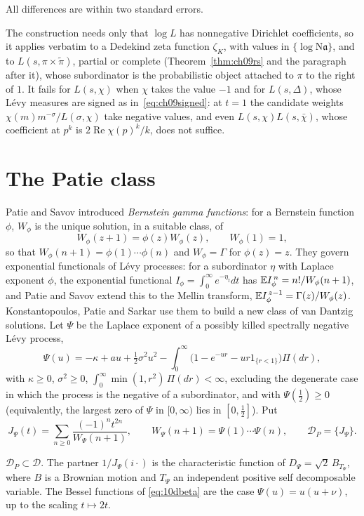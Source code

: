 \noindent All differences are within two standard errors.

The construction needs only that $\log L$ has nonnegative Dirichlet coefficients, so it applies verbatim to a Dedekind zeta function $\zeta_K$, with values in $\{\log\mathrm N\mathfrak a\}$, and to $L(s,\pi\times\tilde\pi)$, partial or complete (Theorem~\ref{thm:ch09rs} and the paragraph after it), whose subordinator is the probabilistic object attached to $\pi$ to the right of $1$. It fails for $L(s,\chi)$ when $\chi$ takes the value $-1$ and for $L(s,\Delta)$, whose L\'evy measures are signed as in~\eqref{eq:ch09signed}: at $t=1$ the candidate weights $\chi(m)m^{-\sigma}/L(\sigma,\chi)$ take negative values, and even $L(s,\chi)L(s,\bar\chi)$, whose coefficient at $p^k$ is $2\operatorname{Re}\chi(p)^k/k$, does not suffice.

\section{The Patie class}

Patie and Savov \cite{patiesavov2018} introduced \emph{Bernstein gamma functions}: for a Bernstein function $\phi$, $W_\phi$ is the unique solution, in a suitable class, of
\[
W_\phi(z+1) = \phi(z)W_\phi(z),\qquad W_\phi(1) = 1,
\]
so that $W_\phi(n+1) = \phi(1)\cdots\phi(n)$ and $W_\phi = \Gamma$ for $\phi(z) = z$. They govern exponential functionals of L\'evy processes: for a subordinator $\eta$ with Laplace exponent $\phi$, the exponential functional $I_\phi = \int_0^\infty e^{-\eta_t}dt$ has $\mathbb{E} I_\phi^{\,n} = n!/W_\phi(n+1)$, and Patie and Savov extend this to the Mellin transform, $\mathbb{E} I_\phi^{\,z-1} = \Gamma(z)/W_\phi(z)$. Konstantopoulos, Patie and Sarkar use them to build a new class of van Dantzig solutions. Let $\Psi$ be the Laplace exponent of a possibly killed spectrally negative L\'evy process,
\[
\Psi(u) = -\kappa+au+\tfrac12\sigma^2u^2-\int_0^\infty\bigl(1-e^{-ur}-ur\mathrm{1}_{\{r<1\}}\bigr)\Pi(dr),
\]
with $\kappa\ge0$, $\sigma^2\ge0$, $\int_0^\infty\min(1,r^2)\,\Pi(dr)<\infty$, excluding the degenerate case in which the process is the negative of a subordinator, and with $\Psi(\frac12)\ge0$ (equivalently, the largest zero of $\Psi$ in $[0,\infty)$ lies in $[0,\frac12]$). Put
\[
J_\Psi(t) = \sum_{n\ge0}\frac{(-1)^nt^{2n}}{W_\Psi(n+1)},\qquad W_\Psi(n+1) = \Psi(1)\cdots\Psi(n),\qquad\mathcal D_P = \{J_\Psi\}.
\]

\begin{theorem}\label{thm:10dpatie}
$\mathcal D_P\subset\mathcal D$. The partner $1/J_\Psi(i\cdot)$ is the characteristic function of $D_\Psi = \sqrt2\,B_{T_\Psi}$, where $B$ is a Brownian motion and $T_\Psi$ an independent positive self decomposable variable. The Bessel functions of \eqref{eq:10dbeta} are the case $\Psi(u) = u(u+\nu)$, up to the scaling $t\mapsto2t$.
\end{theorem}

